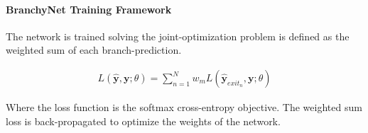 \paragraph{BranchyNet Training Framework}

The network is trained solving the joint-optimization problem is defined as the weighted sum of each branch-prediction.

\begin{align*}
	L(\hat{\mathbf{y}},\mathbf{y};\theta) = \sum_{n=1}^{N} w_m L(\hat{\mathbf{y}}_{exit_n},\mathbf{y};\theta)
\end{align*}

Where the loss function is the softmax cross-entropy objective.
The weighted sum loss is back-propagated to optimize the weights of the network. 